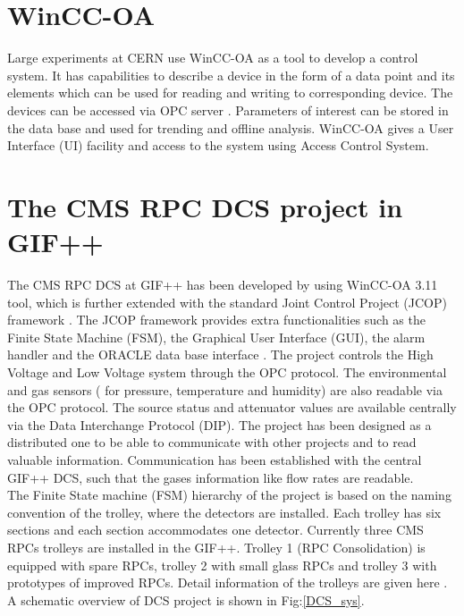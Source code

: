 \documentclass[a4paper,11pt]{article}
\begin{document}
\section{WinCC-OA}Large experiments at CERN use WinCC-OA as a tool to develop a control system. It has capabilities to describe a device in the form of a data point and its elements which can be used for reading and writing to corresponding device. The devices can be accessed via OPC server \cite{opc}. Parameters of interest can be stored in the data base and used for trending and offline analysis. WinCC-OA gives a User Interface (UI) facility and access to the system using Access Control System.

\section{The CMS RPC DCS project in GIF++}
The CMS RPC DCS at GIF++ has been developed by using WinCC-OA 3.11 tool, which is further extended with the standard Joint Control Project (JCOP) framework \cite{jcop}. The JCOP framework provides extra functionalities such as the Finite State Machine (FSM), the Graphical User Interface (GUI), the alarm handler and the ORACLE data base interface \cite{g-polese}. The project controls the High Voltage and Low Voltage system through the OPC protocol. The environmental and gas sensors ( for pressure, temperature and humidity) are also readable via the OPC protocol. The source status and attenuator values are available centrally via the Data Interchange Protocol (DIP). The project has been designed as a distributed one to be able to communicate with other projects and to read valuable information. Communication has been established with the central GIF++ DCS, such that the gases information like flow rates are readable.\\
The Finite State machine (FSM) hierarchy of the project is based on the naming convention of the trolley, where the detectors are installed. Each trolley has six sections and each section accommodates one detector. Currently three CMS RPCs trolleys are installed in the GIF++. Trolley 1 (RPC Consolidation) is equipped with spare RPCs, trolley 2 with small glass RPCs and trolley 3 with prototypes of improved RPCs. Detail information of the trolleys are given here \cite{salvador}. 
A schematic overview of DCS project is shown in Fig:\ref{DCS_sys}. 
\end{document}
